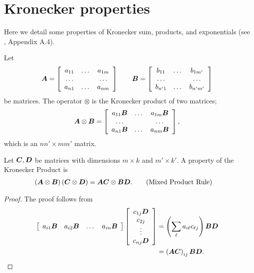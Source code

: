 \section{Kronecker properties}\label{appendix: kronecker}
Here we detail some properties of Kronecker sum, products, and exponentials (see \citep{MEinAP}, Appendix A.4). 

Let 
\[\boldsymbol A = \left[\begin{array}{ccc}a_{11} & \dots & a_{1m}\\\hdots & & \hdots \\ a_{n1}&\dots & a_{nm}\end{array}\right]
\qquad
\boldsymbol{B} = \left[\begin{array}{ccc}b_{11} & \dots & b_{1m'}\\\hdots & & \hdots \\ b_{n'1}&\dots & b_{n'm'}\end{array}\right]\]
be matrices. The operator \(\otimes\) is the Kronecker product of two matrices; 
\[\boldsymbol A\otimes \boldsymbol{B} = \left[\begin{array}{ccc}a_{11}\boldsymbol{B} & \dots & a_{1m}\boldsymbol{B}\\\hdots & & \hdots \\ a_{n1}\boldsymbol{B}&\dots & a_{nm}\boldsymbol{B}\end{array}\right],\]
which is an \(nn'\times mm'\) matrix. 

Let \(\boldsymbol{C},\boldsymbol{D}\)  be matrices with dimensions \(m\times k\) and \(m'\times k'\). A property of the Kronecker Product is 
\begin{align}
	\left(\boldsymbol A\otimes \boldsymbol{B}\right)\left(\boldsymbol{C}\otimes \boldsymbol{D}\right) &= \boldsymbol A\boldsymbol{C}\otimes \boldsymbol{B}\boldsymbol{D}.\label{eqn:mpr}\tag{Mixed Product Rule}
\end{align}
\begin{proof}
	The proof follows from 
	\begin{align*}
		\left[\begin{array}{cccc}a_{i1}\boldsymbol{B} & a_{i2}\boldsymbol{B}&\dots&a_{in}\boldsymbol{B}\end{array}\right]\left[\begin{array}{c}c_{1j}\boldsymbol{D}\\c_{2j}\\\vdots\\c_{nj}\boldsymbol{D} \end{array}\right] 
		&= \left(\sum_\ell a_{i\ell}c_{\ell j}\right) \boldsymbol{B}\boldsymbol{D}
		\\&= \left(\boldsymbol A\boldsymbol{C}\right)_{ij}\boldsymbol{B}\boldsymbol{D}.
	\end{align*}
\end{proof}


